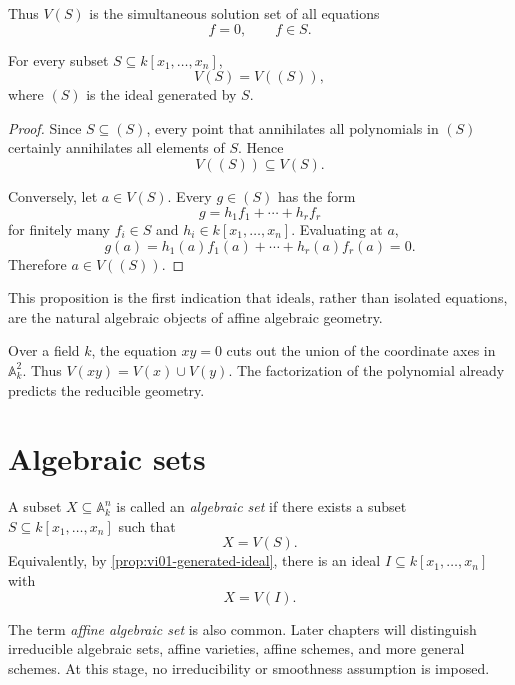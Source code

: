 Thus \(V(S)\) is the simultaneous solution set of all equations
\[
  f=0,\qquad f\in S.
\]

\begin{proposition}
\label{prop:vi01-generated-ideal}
For every subset \(S\subseteq k[x_1,\dots,x_n]\),
\[
  V(S)=V((S)),
\]
where \((S)\) is the ideal generated by \(S\).
\end{proposition}

\begin{proof}
Since \(S\subseteq (S)\), every point that annihilates all polynomials in \((S)\) certainly
annihilates all elements of \(S\).  Hence
\[
  V((S))\subseteq V(S).
\]

Conversely, let \(a\in V(S)\).  Every \(g\in(S)\) has the form
\[
  g=h_1f_1+\cdots+h_rf_r
\]
for finitely many \(f_i\in S\) and \(h_i\in k[x_1,\dots,x_n]\).  Evaluating at \(a\),
\[
  g(a)
  =
  h_1(a)f_1(a)+\cdots+h_r(a)f_r(a)
  =0.
\]
Therefore \(a\in V((S))\).
\end{proof}

This proposition is the first indication that ideals, rather than isolated equations, are the
natural algebraic objects of affine algebraic geometry.

\begin{example}\label{ex:vi01-expand-01}
Over a field $k$, the equation $xy=0$ cuts out the union of the coordinate axes in $\mathbb A^2_k$.  Thus $V(xy)=V(x)\cup V(y)$.  The factorization of the polynomial already predicts the reducible geometry.
\end{example}
\section{Algebraic sets}
\label{sec:vi01-algebraic-sets}

\begin{definition}
A subset \(X\subseteq\mathbb A_k^n\) is called an \emph{algebraic set} if there exists a
subset \(S\subseteq k[x_1,\dots,x_n]\) such that
\[
  X=V(S).
\]
Equivalently, by \cref{prop:vi01-generated-ideal}, there is an ideal
\(I\subseteq k[x_1,\dots,x_n]\) with
\[
  X=V(I).
\]
\end{definition}

The term \emph{affine algebraic set} is also common.  Later chapters will distinguish
irreducible algebraic sets, affine varieties, affine schemes, and more general schemes.  At
this stage, no irreducibility or smoothness assumption is imposed.

